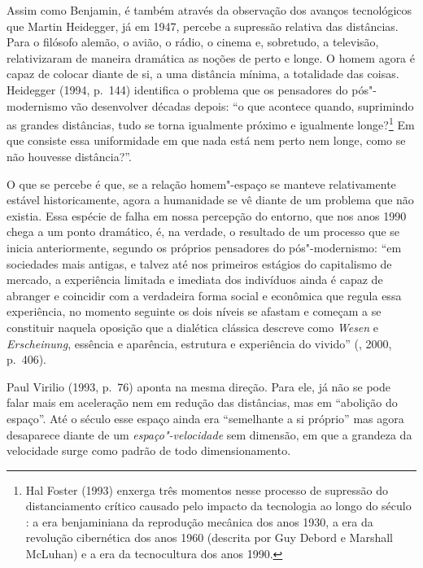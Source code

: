 Assim como Benjamin, é também através da observação dos avanços
tecnológicos que Martin Heidegger, já em 1947, percebe a supressão
relativa das distâncias. Para o filósofo alemão, o avião, o rádio, o
cinema e, sobretudo, a televisão, relativizaram de maneira dramática as
noções de perto e longe. O homem agora é capaz de colocar diante de si,
a uma distância mínima, a totalidade das coisas. Heidegger (1994, p.~144) identifica o problema que os pensadores do pós"-modernismo vão
desenvolver décadas depois: ``o que acontece quando, suprimindo as
grandes distâncias, tudo se torna igualmente próximo e igualmente longe?\footnote{Hal Foster (1993) enxerga três momentos nesse processo de
  supressão do distanciamento crítico causado pelo impacto da tecnologia
  ao longo do século : a era benjaminiana da reprodução mecânica dos
  anos 1930, a era da revolução cibernética dos anos 1960 (descrita por
  Guy Debord e Marshall McLuhan) e a era da tecnocultura dos anos 1990.}
Em que consiste essa uniformidade em que nada está nem perto nem longe,
como se não houvesse distância?''.

O que se percebe é que, se a relação homem"-espaço se manteve
relativamente estável historicamente, agora a humanidade se vê diante de
um problema que não existia. Essa espécie de falha em nossa percepção do
entorno, que nos anos 1990 chega a um ponto dramático, é, na verdade, o
resultado de um processo que se inicia anteriormente, segundo os
próprios pensadores do pós"-modernismo: ``em sociedades mais antigas, e
talvez até nos primeiros estágios do capitalismo de mercado, a
experiência limitada e imediata dos indivíduos ainda é capaz de abranger
e coincidir com a verdadeira forma social e econômica que regula essa
experiência, no momento seguinte os dois níveis se afastam e começam a
se constituir naquela oposição que a dialética clássica descreve como
\emph{Wesen} e \emph{Erscheinung}, essência e aparência, estrutura e
experiência do vivido'' (, 2000, p.~406).

Paul Virilio (1993, p.~76) aponta na mesma direção.
Para ele, já não se pode falar mais em aceleração nem em redução das
distâncias, mas em ``abolição do espaço''. Até o século  esse espaço
ainda era ``semelhante a si próprio'' mas agora desaparece diante de um
\emph{espaço"-velocidade} sem dimensão, em que a grandeza da velocidade
surge como padrão de todo dimensionamento.

